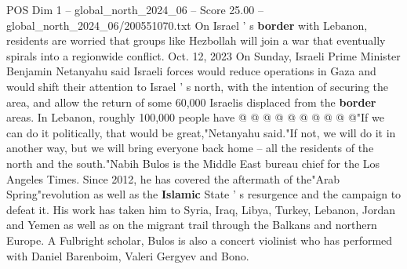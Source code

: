 \begin{textsample}{POS Dim 1 – global\_north\_2024\_06 – Score 25.00 – global\_north\_2024\_06/200551070.txt}
On Israel ' s \textbf{border} with Lebanon, residents are worried that groups like Hezbollah will join a war that eventually spirals into a regionwide conflict.
Oct. 12, 2023 On Sunday, Israeli Prime Minister Benjamin Netanyahu said Israeli forces would reduce operations in Gaza and would shift their attention to Israel ' s north, with the intention of securing the area, and allow the return of some 60,000 Israelis displaced from the \textbf{border} areas.
In Lebanon, roughly 100,000 people have @ @ @ @ @ @ @ @ @ @"If we can do it politically, that would be great,"Netanyahu said."If not, we will do it in another way, but we will bring everyone back home -- all the residents of the north and the south."Nabih Bulos is the Middle East bureau chief for the Los Angeles Times.
Since 2012, he has covered the aftermath of the"Arab Spring"revolution as well as the \textbf{Islamic} State ' s resurgence and the campaign to defeat it.
His work has taken him to Syria, Iraq, Libya, Turkey, Lebanon, Jordan and Yemen as well as on the migrant trail through the Balkans and northern Europe.
A Fulbright scholar, Bulos is also a concert violinist who has performed with Daniel Barenboim, Valeri Gergyev and Bono.

\end{textsample}
